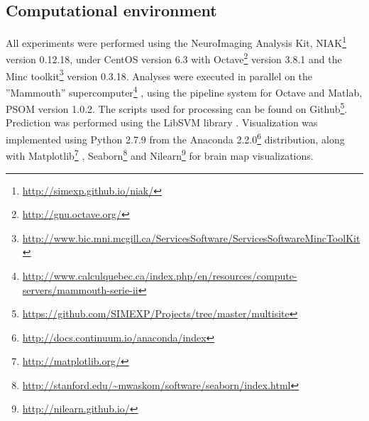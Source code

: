 \documentclass[authoryear]{elsarticle}
\begin{document}
\subsection{Computational environment}
All experiments were performed using the NeuroImaging Analysis Kit, NIAK\footnote{\url{http://simexp.github.io/niak/}} \citep{Bellec2011} version 0.12.18, under CentOS version 6.3 with Octave\footnote{\url{http://gnu.octave.org/}} version 3.8.1 and the Minc toolkit\footnote{\url{http://www.bic.mni.mcgill.ca/ServicesSoftware/ServicesSoftwareMincToolKit}} version 0.3.18. Analyses were executed in parallel on the ”Mammouth” supercomputer\footnote{\url{http://www.calculquebec.ca/index.php/en/resources/compute-servers/mammouth-serie-ii}} , using the pipeline system for Octave and Matlab, PSOM \citep{Bellec2012} version 1.0.2. The scripts used for processing can be found on Github\footnote{\url{https://github.com/SIMEXP/Projects/tree/master/multisite}}. Prediction was performed using the LibSVM library \citep{Chang2011}. Visualization was implemented using Python 2.7.9 from the Anaconda 2.2.0\footnote{\url{http://docs.continuum.io/anaconda/index}} distribution, along with Matplotlib\footnote{\url{http://matplotlib.org/}} \citep{matplotlib}, Seaborn\footnote{\url{http://stanford.edu/~mwaskom/software/seaborn/index.html}} and Nilearn\footnote{\url{http://nilearn.github.io/}} for brain map visualizations.
\end{document}
